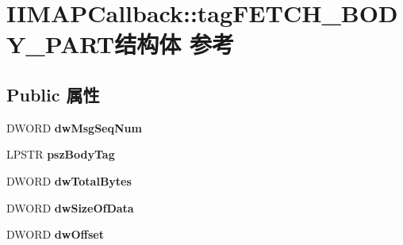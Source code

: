 \hypertarget{struct_i_i_m_a_p_callback_1_1tag_f_e_t_c_h___b_o_d_y___p_a_r_t}{}\section{I\+I\+M\+A\+P\+Callback\+:\+:tag\+F\+E\+T\+C\+H\+\_\+\+B\+O\+D\+Y\+\_\+\+P\+A\+R\+T结构体 参考}
\label{struct_i_i_m_a_p_callback_1_1tag_f_e_t_c_h___b_o_d_y___p_a_r_t}
\subsection*{Public 属性}
\begin{DoxyCompactItemize}
\item 
\mbox{\label{struct_i_i_m_a_p_callback_1_1tag_f_e_t_c_h___b_o_d_y___p_a_r_t_a45c7f7a3e3e9693bc5e2904a36ea305b}} 
D\+W\+O\+RD {\bfseries dw\+Msg\+Seq\+Num}
\item 
\mbox{\label{struct_i_i_m_a_p_callback_1_1tag_f_e_t_c_h___b_o_d_y___p_a_r_t_a78da317fe3602f384e330dc6475bc4da}} 
L\+P\+S\+TR {\bfseries psz\+Body\+Tag}
\item 
\mbox{\label{struct_i_i_m_a_p_callback_1_1tag_f_e_t_c_h___b_o_d_y___p_a_r_t_af5e196190073a5f2e41a009f651a8d61}} 
D\+W\+O\+RD {\bfseries dw\+Total\+Bytes}
\item 
\mbox{\label{struct_i_i_m_a_p_callback_1_1tag_f_e_t_c_h___b_o_d_y___p_a_r_t_a4b4b7bb2d842b24c17e8891c21dfc350}} 
D\+W\+O\+RD {\bfseries dw\+Size\+Of\+Data}
\item 
\mbox{\label{struct_i_i_m_a_p_callback_1_1tag_f_e_t_c_h___b_o_d_y___p_a_r_t_a288b489bcb44096647c8d11e97b5b26f}} 
D\+W\+O\+RD {\bfseries dw\+Offset}
\item 
\mbox{\label{struct_i_i_m_a_p_callback_1_1tag_f_e_t_c_h___b_o_d_y___p_a_r_t_a0ba5ed9f576b9de7539422903b95b1c9}} 

\end{DoxyCompactItemize}

